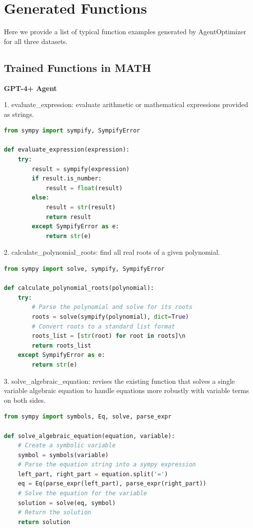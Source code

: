 \documentclass{article}
\theoremstyle{plain}
\theoremstyle{definition}
\theoremstyle{remark}
\begin{document}
\section{Generated Functions}
Here we provide a list of typical function examples generated by AgentOptimizer for all three datasets.

\subsection{Trained Functions in MATH}

\textbf{GPT-4+ Agent}


1. evaluate\_expression:
evaluate arithmetic or mathematical expressions provided as strings.

\begin{lstlisting}[language=Python]
from sympy import sympify, SympifyError

def evaluate_expression(expression):
    try:
        result = sympify(expression)        
        if result.is_number:            
            result = float(result)        
        else:            
            result = str(result)        
            return result    
        except SympifyError as e:        
            return str(e)
\end{lstlisting}

2. calculate\_polynomial\_roots:
find all real roots of a given polynomial.

\begin{lstlisting}[language=Python]
from sympy import solve, sympify, SympifyError

def calculate_polynomial_roots(polynomial):    
    try:        
        # Parse the polynomial and solve for its roots        
        roots = solve(sympify(polynomial), dict=True)        
        # Convert roots to a standard list format        
        roots_list = [str(root) for root in roots]\n        
        return roots_list    
    except SympifyError as e:        
        return str(e)
\end{lstlisting}

3. solve\_algebraic\_equation:
revises the existing function that solves a single variable algebraic equation to handle equations more robustly with variable terms on both sides.
\begin{lstlisting}[language=Python]
from sympy import symbols, Eq, solve, parse_expr

def solve_algebraic_equation(equation, variable):
    # Create a symbolic variable
    symbol = symbols(variable)
    # Parse the equation string into a sympy expression
    left_part, right_part = equation.split('=')
    eq = Eq(parse_expr(left_part), parse_expr(right_part))
    # Solve the equation for the variable
    solution = solve(eq, symbol)
    # Return the solution
    return solution
\end{lstlisting}
\end{document}
